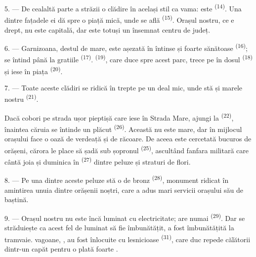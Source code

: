5. --- De cealaltă parte a străzii  o clădire în același stil ca vama:
este  \textsuperscript{(14)}. Una dintre fațadele ei dă spre o piață
mică, unde se află  \textsuperscript{(15)}. Orașul nostru, ce e
drept, nu este capitală, dar este totuși un însemnat centru de județ.

\VUsaut{5.0mm}
\VUsaut{3.4mm}

6. --- Garnizoana, destul de mare, este așezată în  întinse și
foarte sănătoase \textsuperscript{(16)}; se întind până la gratiile
 \textsuperscript{(17)}. 
\textsuperscript{(19)}, care duce spre acest parc, trece pe în dosul  \textsuperscript{(18)} și iese în piața 
\textsuperscript{(20)}.

7. --- Toate aceste clădiri se ridică în trepte pe un deal mic, unde stă și marele
nostru  \textsuperscript{(21)}.

Dacă cobori pe strada ușor pieptișă care iese în Strada Mare, ajungi la
 \textsuperscript{(22)}, înaintea căruia se întinde un
 plăcut \textsuperscript{(26)}. Această  nu este mare,
dar în mijlocul orașului face o oază de verdeață și de răcoare. De aceea este
cercetată bucuros de orășeni, cărora le place să șadă sub șopronul
 \textsuperscript{(25)}, ascultând fanfara militară care cântă
joia și duminica în  \textsuperscript{(27)} dintre peluze și
straturi de flori.

8. --- Pe una dintre aceste peluze stă o  de bronz
\textsuperscript{(28)}, monument ridicat în amintirea unuia dintre orășenii noștri,
care a adus mari servicii orașului său de baștină.

\VUsaut{4.0mm}
\VUsaut{3.4mm}

9. --- Orașul nostru nu este încă luminat cu electricitate; are numai
 \textsuperscript{(29)}. Dar  se
străduiește ca acest fel de luminat să fie îmbunătățit,  a fost
îmbunătățită  la tramvaie.  vagoane,
 , au fost înlocuite cu
 lesnicioase \textsuperscript{(31)}, care duc repede
călătorii dintr-un capăt  pentru o plată foarte
.

